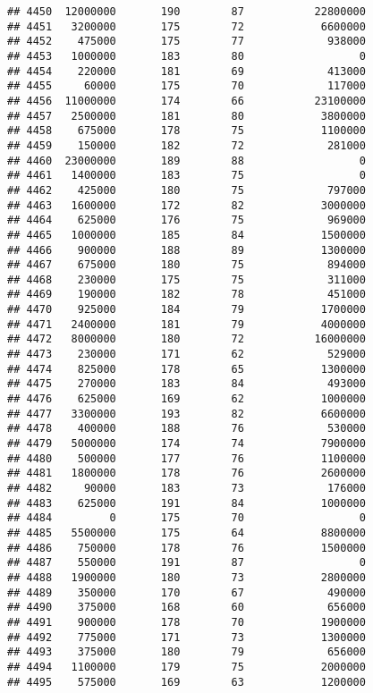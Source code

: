 \documentclass[
]{article}
\begin{document}
\begin{verbatim}
## 4450  12000000       190        87           22800000
## 4451   3200000       175        72            6600000
## 4452    475000       175        77             938000
## 4453   1000000       183        80                  0
## 4454    220000       181        69             413000
## 4455     60000       175        70             117000
## 4456  11000000       174        66           23100000
## 4457   2500000       181        80            3800000
## 4458    675000       178        75            1100000
## 4459    150000       182        72             281000
## 4460  23000000       189        88                  0
## 4461   1400000       183        75                  0
## 4462    425000       180        75             797000
## 4463   1600000       172        82            3000000
## 4464    625000       176        75             969000
## 4465   1000000       185        84            1500000
## 4466    900000       188        89            1300000
## 4467    675000       180        75             894000
## 4468    230000       175        75             311000
## 4469    190000       182        78             451000
## 4470    925000       184        79            1700000
## 4471   2400000       181        79            4000000
## 4472   8000000       180        72           16000000
## 4473    230000       171        62             529000
## 4474    825000       178        65            1300000
## 4475    270000       183        84             493000
## 4476    625000       169        62            1000000
## 4477   3300000       193        82            6600000
## 4478    400000       188        76             530000
## 4479   5000000       174        74            7900000
## 4480    500000       177        76            1100000
## 4481   1800000       178        76            2600000
## 4482     90000       183        73             176000
## 4483    625000       191        84            1000000
## 4484         0       175        70                  0
## 4485   5500000       175        64            8800000
## 4486    750000       178        76            1500000
## 4487    550000       191        87                  0
## 4488   1900000       180        73            2800000
## 4489    350000       170        67             490000
## 4490    375000       168        60             656000
## 4491    900000       178        70            1900000
## 4492    775000       171        73            1300000
## 4493    375000       180        79             656000
## 4494   1100000       179        75            2000000
## 4495    575000       169        63            1200000

\end{verbatim}
\end{document}
